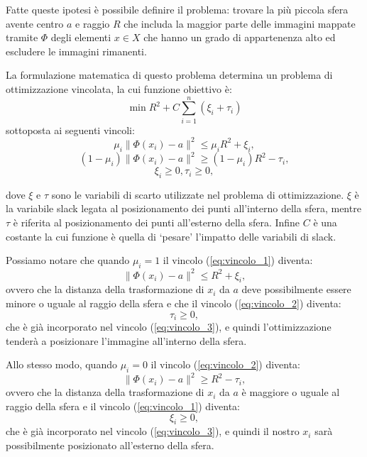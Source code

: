 \documentclass[a4paper,12pt]{report}
\begin{document}
\noindent Fatte queste ipotesi è possibile definire il problema: trovare la più piccola sfera avente centro $a$ e raggio $R$ che includa la maggior parte delle immagini mappate tramite $\Phi$ degli elementi $x\in X$ che hanno un grado di appartenenza alto ed escludere le immagini rimanenti.



La formulazione matematica di questo problema determina un problema di ottimizzazione vincolata, la cui funzione obiettivo è:
\begin{equation}
    \min R^2 + C\displaystyle\sum_{i=1}^{n}(\xi_i+\tau_i)
    \label{eq:Problema_di_partenza}
\end{equation}
sottoposta ai seguenti vincoli:
\begin{equation}
    \mu_i\|\Phi(x_i)-a\|^2\le\mu_iR^2 + \xi_i,
    \label{eq:vincolo_1}
\end{equation}
\begin{equation}
    (1-\mu_i)\|\Phi(x_i)-a\|^2 \ge (1-\mu_i)R^2 - \tau_i,
    \label{eq:vincolo_2}
\end{equation}
\begin{equation}
    \xi_i \ge 0, \tau_i \ge 0,
    \label{eq:vincolo_3}
\end{equation}


\noindent dove $\xi$ e $\tau$ sono le variabili di scarto utilizzate nel problema di ottimizzazione. $\xi$ è la variabile slack legata al posizionamento dei punti all'interno della sfera, mentre $\tau$ è riferita al posizionamento dei punti all'esterno della sfera. Infine $C$ è una costante la cui funzione è quella di `pesare' l'impatto delle variabili di slack.

Possiamo notare che quando $\mu_i = 1$ il vincolo (\ref{eq:vincolo_1}) diventa:
\begin{equation*}
    \|\Phi(x_i)-a\|^{2} \le R^2 + \xi_i,
\end{equation*}
ovvero che la distanza della trasformazione di $x_i$ da $a$ deve possibilmente essere minore o uguale al raggio della sfera e che il vincolo (\ref{eq:vincolo_2}) diventa:
\begin{equation*}
    \tau_i \ge 0,
\end{equation*}
che è già incorporato nel vincolo (\ref{eq:vincolo_3}), e quindi l'ottimizzazione tenderà a posizionare l'immagine all'interno della sfera.

Allo stesso modo, quando $\mu_i = 0$ il vincolo (\ref{eq:vincolo_2}) diventa:
\begin{equation*}
    \|\Phi(x_i)-a\|^2 \ge R^2 - \tau_i,
\end{equation*}
ovvero che la distanza della trasformazione di $x_i$ da $a$ è maggiore o uguale al raggio della sfera e il vincolo (\ref{eq:vincolo_1}) diventa:
\begin{equation*}
    \xi_i \ge 0,
\end{equation*}
che è già incorporato nel vincolo (\ref{eq:vincolo_3}), e quindi il nostro $x_i$ sarà possibilmente posizionato all'esterno della sfera.
\end{document}
